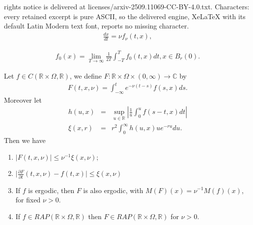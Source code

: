 \documentclass[10pt,a4paper]{amsart}
\newcommand{\bb}[1]{{\mathbb{#1}}}
\begin{document}
rights notice is delivered at licenses/arxiv-2509.11069-CC-BY-4.0.txt. Characters: every retained excerpt is pure ASCII, so the delivered engine, XeLaTeX with its default Latin Modern text font, reports no missing character.
\begin{eqnarray}  
\frac{dx}{dt}=\nu f_{\nu}(t,x),\label{averaging_inicial}  
\end{eqnarray}  

\begin{eqnarray}
f_0(x)=\lim_{T\rightarrow \infty} \frac{1}{2T}\int_{-T}^{T} f_0(t,x)dt, x\in B_{r}(0). \label{promedio}
\end{eqnarray}

\begin{lem}\label{lema_tecnico_desigualdad}
Let $f\in C(\bb{R}\times\Omega,\bb{R})$, we define $F:\bb{R}\times\Omega\times (0,\infty)\rightarrow \bb{C}$ by
\begin{eqnarray}
F(t,x,\nu)=\int_{-\infty}^{t} e^{-\nu(t-s)}f(s,x)ds.\label{F_exp_nu}
\end{eqnarray}
Moreover let
\begin{eqnarray}
h(u,x)&=&\sup_{u\in\bb{R}}\left\vert \frac{1}{u}\int_{0}^{u}f(s-t,x)dt \right\vert \label{h_ux}\\
\xi(x,r)&=&r^{2}\int_{0}^{\infty} h(u,x) ue^{-ru}du.\label{xi_xr}
\end{eqnarray}
Then we have
\begin{enumerate}
\item $\vert F(t,x,\nu)\vert\leq \nu^{-1}\xi(x,\nu)$;

\item  $\vert \frac{\partial F}{\partial t}(t,x,\nu)-f(t,x)\vert\leq \xi(x,\nu)$

\item If $f$ is ergodic, then $F$ is also ergodic, with $M(F)(x)=\nu^{-1}M(f)(x)$, for fixed $\nu>0$.

\item If $f\in RAP(\bb{R}\times\Omega,\bb{R})$ then $F\in RAP(\bb{R}\times\Omega,\bb{R})$ for $\nu>0.$
\end{enumerate}
\end{lem}
\end{document}
